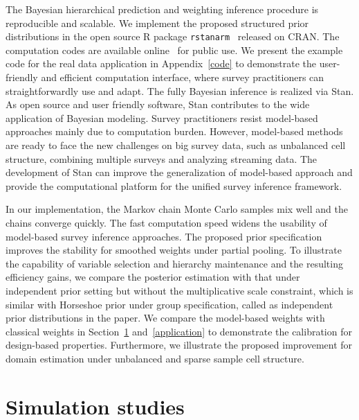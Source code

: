 \documentclass[11pt]{article}
\numberwithin{figure}{section}
\numberwithin{table}{section}
\numberwithin{equation}{section}
\begin{document}
The Bayesian hierarchical prediction and weighting inference procedure is
reproducible and scalable. We implement the proposed structured prior
distributions in the open source R package {\tt rstanarm}~\citep{rstanarm}
released on CRAN. The computation codes are available online~\citep{code:si}
for public use. We present the example code for the real data application in
Appendix~\ref{code} to demonstrate the user-friendly and efficient computation
interface, where survey practitioners can straightforwardly use and adapt. The
fully Bayesian inference is realized via Stan. As open source and user friendly
software, Stan contributes to the wide application of Bayesian modeling. Survey
practitioners resist model-based approaches mainly due to computation burden.
However, model-based methods are ready to face the new challenges on big survey
data, such as unbalanced cell structure, combining multiple surveys and
analyzing streaming data. The development of Stan can improve the
generalization of model-based approach and provide the computational platform
for the unified survey inference framework.

In our implementation, the Markov chain Monte Carlo samples mix well and the
chains converge quickly. The fast computation speed widens the usability of
model-based survey inference approaches. The proposed prior specification
improves the stability for smoothed weights under partial pooling. To
illustrate the capability of variable selection and hierarchy maintenance and
the resulting efficiency gains, we compare the posterior estimation with that
under independent prior setting but without the multiplicative scale
constraint, which is similar with Horseshoe prior under group specification,
called as independent prior distributions in the paper. We compare the
model-based weights with classical weights in Section~\ref{simulation}
and~\ref{application} to demonstrate the calibration for design-based
properties. Furthermore, we illustrate the proposed improvement for domain
estimation under unbalanced and sparse sample cell structure. 


\section{Simulation studies} \label{simulation}
\end{document}
